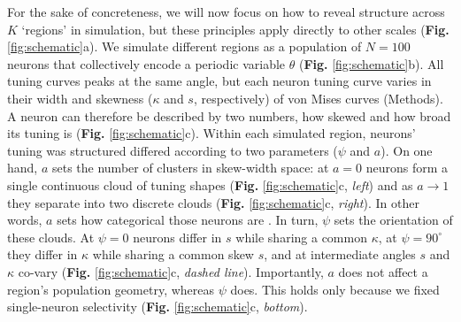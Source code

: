 For the sake of concreteness, we will now focus on how to reveal structure across $K$ `regions' in simulation, but these principles apply directly to other scales (\textbf{Fig. } \ref{fig:schematic}a). We simulate different regions as a population of $N = 100$ neurons that collectively encode a periodic variable $\theta$ (\textbf{Fig. } \ref{fig:schematic}b). All tuning curves peaks at the same angle, but each neuron tuning curve varies in their width and skewness ($\kappa$ and $s$, respectively) of von Mises curves (Methods). A neuron can therefore be described by two numbers, how skewed and how broad its tuning is (\textbf{Fig.} \ref{fig:schematic}c). Within each simulated region, neurons' tuning was structured differed according to two parameters ($\psi$ and $a$). On one hand, $a$ sets the number of clusters in skew-width space: at $a = 0$ neurons form a single continuous cloud of tuning shapes (\textbf{Fig. }\ref{fig:schematic}c, \textit{left}) and as $a \to 1$ they separate into two discrete clouds (\textbf{Fig. }\ref{fig:schematic}c, \textit{right}). In other words, $a$ sets how categorical those neurons are \parencite{posani2026}. In turn, $\psi$ sets the orientation of these clouds.  At $\psi = 0$ neurons differ in $s$ while sharing a common $\kappa$, at $\psi = 90^\circ$ they differ in $\kappa$ while sharing a common skew $s$, and at intermediate angles $s$ and $\kappa$ co-vary (\textbf{Fig. }\ref{fig:schematic}c, \textit{dashed line}). Importantly, $a$ does not affect a region's population geometry, whereas $\psi$ does. This holds only because we fixed single-neuron selectivity (\textbf{Fig. } \ref{fig:schematic}c, \textit{bottom}).


